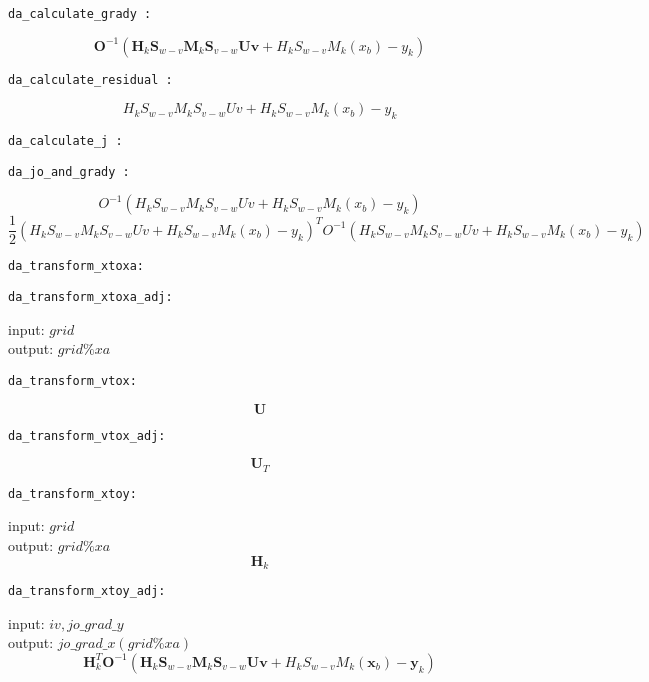 \documentclass[a4paper,12pt,titlepage]{article}
\begin{document}
\begin{verbatim}
da_calculate_grady :
 \end{verbatim} 
\[
\mathbf{O}^{-1}(\mathbf{H}_k\mathbf{S}_{w-v}\mathbf{M}_k\mathbf{S}_{v-w}\mathbf{Uv}+H_kS_{w-v}M_k(x_b)-y_k)
\] 

\begin{verbatim}
da_calculate_residual :
 \end{verbatim} 
\[
H_kS_{w-v}M_kS_{v-w}Uv+H_kS_{w-v}M_k(x_b)-y_k
\] 
 
 
\begin{verbatim}
da_calculate_j :
 \end{verbatim}
 
\begin{verbatim}
da_jo_and_grady :
 \end{verbatim} 
\[
O^{-1}(H_kS_{w-v}M_kS_{v-w}Uv+H_kS_{w-v}M_k(x_b)-y_k)
\] 
\[
\frac{1}{2}(H_kS_{w-v}M_kS_{v-w}Uv+H_kS_{w-v}M_k(x_b)-y_k)^TO^{-1}(H_kS_{w-v}M_kS_{v-w}Uv+H_kS_{w-v}M_k(x_b)-y_k)
\] 

\begin{verbatim}
da_transform_xtoxa:
\end{verbatim} 

\begin{verbatim}
da_transform_xtoxa_adj:
\end{verbatim} 
input: $grid$\\
output: $grid\%xa$\\

\begin{verbatim}
da_transform_vtox:
\end{verbatim} 
\[
\mathbf{U}
\]

\begin{verbatim}
da_transform_vtox_adj:
\end{verbatim} 
\[
\mathbf{U}_T
\]
 
\begin{verbatim}
da_transform_xtoy:
\end{verbatim} 
input: $grid$\\
output: $grid\%xa$\\
\[
\mathbf{H}_k
\]

\begin{verbatim}
da_transform_xtoy_adj:
 \end{verbatim}
input: $iv, jo\_grad\_y$\\
output: $jo\_grad\_x (grid\%xa)$\\
\[
\mathbf{H}_k^T\mathbf{O}^{-1}(\mathbf{H}_k\mathbf{S}_{w-v}\mathbf{M}_k\mathbf{S}_{v-w}\mathbf{Uv}+H_kS_{w-v}M_k(\mathbf{x}_b)-\mathbf{y}_k)
\]
\end{document}
